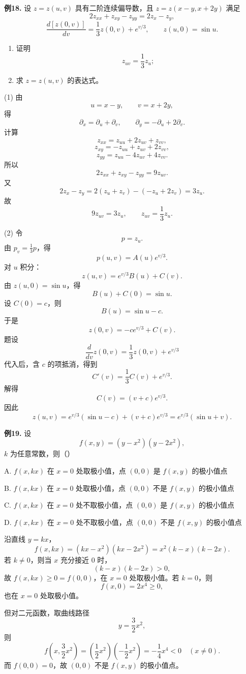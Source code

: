 \begin{problemblock}
\textbf{例18.} 设 \(z=z(u,v)\) 具有二阶连续偏导数，且 \(z=z(x-y,x+2y)\) 满足
\[
2z_{xx}+z_{xy}-z_{yy}=2z_x-z_y,
\]
\[
\frac{d[z(0,v)]}{dv}=\frac13z(0,v)+e^{v/3},\qquad z(u,0)=\sin u.
\]
\begin{enumerate}[label=(\arabic*), leftmargin=2.2em]
\item 证明
\[
z_{uv}=\frac13z_u;
\]
\item 求 \(z=z(u,v)\) 的表达式。
\end{enumerate}
\end{problemblock}
\begin{solutionblock}
(1) 由
\[
u=x-y,\qquad v=x+2y,
\]
得
\[
\partial_x=\partial_u+\partial_v,\qquad
\partial_y=-\partial_u+2\partial_v.
\]
计算
\[
z_{xx}=z_{uu}+2z_{uv}+z_{vv},
\]
\[
z_{xy}=-z_{uu}+z_{uv}+2z_{vv},
\]
\[
z_{yy}=z_{uu}-4z_{uv}+4z_{vv}.
\]
所以
\[
2z_{xx}+z_{xy}-z_{yy}=9z_{uv}.
\]
又
\[
2z_x-z_y=2(z_u+z_v)-(-z_u+2z_v)=3z_u.
\]
故
\[
9z_{uv}=3z_u,
\qquad
z_{uv}=\frac13z_u.
\]

(2) 令
\[
p=z_u.
\]
由 \(p_v=\frac13p\)，得
\[
p(u,v)=A(u)e^{v/3}.
\]
对 \(u\) 积分：
\[
z(u,v)=e^{v/3}B(u)+C(v).
\]
由 \(z(u,0)=\sin u\)，得
\[
B(u)+C(0)=\sin u.
\]
设 \(C(0)=c\)，则
\[
B(u)=\sin u-c.
\]
于是
\[
z(0,v)=-ce^{v/3}+C(v).
\]
题设
\[
\frac d{dv}z(0,v)=\frac13z(0,v)+e^{v/3}
\]
代入后，含 \(c\) 的项抵消，得到
\[
C'(v)=\frac13C(v)+e^{v/3}.
\]
解得
\[
C(v)=(v+c)e^{v/3}.
\]
因此
\[
z(u,v)=e^{v/3}(\sin u-c)+(v+c)e^{v/3}
=e^{v/3}(\sin u+v).
\]
\end{solutionblock}

\begin{problemblock}
\textbf{例19.} 设
\[
f(x,y)=(y-x^2)(y-2x^2),
\]
\(k\) 为任意常数，则（\quad）

A. \(f(x,kx)\) 在 \(x=0\) 处取极小值，点 \((0,0)\) 是 \(f(x,y)\) 的极小值点

B. \(f(x,kx)\) 在 \(x=0\) 处取极小值，点 \((0,0)\) 不是 \(f(x,y)\) 的极小值点

C. \(f(x,kx)\) 在 \(x=0\) 处不取极小值，点 \((0,0)\) 是 \(f(x,y)\) 的极小值点

D. \(f(x,kx)\) 在 \(x=0\) 处不取极小值，点 \((0,0)\) 不是 \(f(x,y)\) 的极小值点
\end{problemblock}
\begin{solutionblock}
沿直线 \(y=kx\)，
\[
f(x,kx)=(kx-x^2)(kx-2x^2)=x^2(k-x)(k-2x).
\]
若 \(k\ne0\)，则当 \(x\) 充分接近 \(0\) 时，
\[
(k-x)(k-2x)>0,
\]
故 \(f(x,kx)\ge0=f(0,0)\)，在 \(x=0\) 处取极小值。若 \(k=0\)，则
\[
f(x,0)=2x^4\ge0,
\]
也在 \(x=0\) 处取极小值。

但对二元函数，取曲线路径
\[
y=\frac32x^2,
\]
则
\[
f\left(x,\frac32x^2\right)
=\left(\frac12x^2\right)\left(-\frac12x^2\right)
=-\frac14x^4<0\quad(x\ne0).
\]
而 \(f(0,0)=0\)，故 \((0,0)\) 不是 \(f(x,y)\) 的极小值点。
\end{solutionblock}

